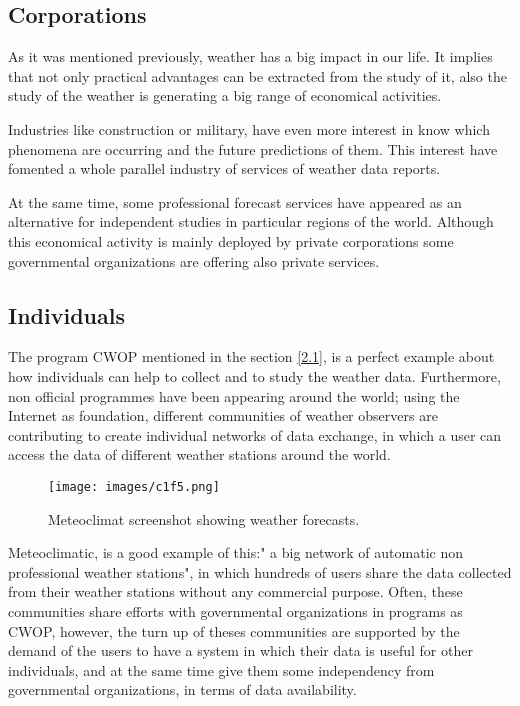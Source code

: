 \subsection{Corporations}

As it was mentioned previously, weather has a big impact in our life. It implies that not only practical advantages can be extracted from the study of it, also the study of the weather is generating a big range of economical activities. 

Industries like construction or military, have even more interest in know which phenomena are occurring and the future predictions of them. This interest have fomented a whole parallel industry of services of weather data reports.

At the same time, some professional forecast services have appeared as an alternative for independent studies in particular regions of the world. Although this economical activity is mainly deployed by private corporations some governmental organizations are offering also private services.

\subsection{Individuals}\label{2.1.3}

The program \gls{CWOP} mentioned in the section \ref{2.1}, is a perfect example about how individuals can help to collect and to study the weather data. Furthermore, non official programmes have been appearing around the world; using the Internet as foundation, different communities of weather observers are contributing to create individual networks of data exchange, in which a user can access the data of different weather stations around the world. 
\begin{figure}[H]
\centerline{\texttt{[image: images/c1f5.png]}}
\caption{Meteoclimat screenshot showing weather forecasts.\protect\footnotemark}
\end{figure}

Meteoclimatic\cite{METEOCLIMATIC}, is a good example of this:" a big network of automatic non professional weather stations", in which hundreds of users share the data collected from their weather stations without any commercial purpose. 
Often, these communities share efforts with governmental organizations in programs as \gls{CWOP}, however, the turn up of theses communities are supported by the demand of the users to have a system in which their data is useful for other individuals, and at the same time give them some independency from governmental  organizations, in terms of data availability.


